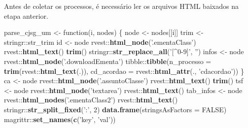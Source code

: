 \documentclass[]{book}
\newenvironment{Shaded}{\begin{snugshade}}{\end{snugshade}}
\newcommand{\KeywordTok}[1]{\textcolor[rgb]{0.13,0.29,0.53}{\textbf{{#1}}}}
\newcommand{\DataTypeTok}[1]{\textcolor[rgb]{0.13,0.29,0.53}{{#1}}}
\newcommand{\DecValTok}[1]{\textcolor[rgb]{0.00,0.00,0.81}{{#1}}}
\newcommand{\StringTok}[1]{\textcolor[rgb]{0.31,0.60,0.02}{{#1}}}
\newcommand{\OtherTok}[1]{\textcolor[rgb]{0.56,0.35,0.01}{{#1}}}
\newcommand{\NormalTok}[1]{{#1}}
\begin{document}
Antes de coletar os processos, é necessário ler os arquivos HTML
baixados na etapa anterior.

\begin{Shaded}
\begin{Highlighting}[]
\NormalTok{parse_cjsg_um <-}\StringTok{ }\NormalTok{function(i, nodes) \{}
  \NormalTok{node <-}\StringTok{ }\NormalTok{nodes[[i]]}
  \NormalTok{trim <-}\StringTok{ }\NormalTok{stringr::str_trim}
  \NormalTok{id <-}\StringTok{ }\NormalTok{node %>%}
\StringTok{    }\NormalTok{rvest::}\KeywordTok{html_node}\NormalTok{(}\StringTok{'.ementaClass'}\NormalTok{) %>%}
\StringTok{    }\NormalTok{rvest::}\KeywordTok{html_text}\NormalTok{() %>%}
\StringTok{    }\KeywordTok{trim}\NormalTok{() %>%}
\StringTok{    }\NormalTok{stringr::}\KeywordTok{str_replace_all}\NormalTok{(}\StringTok{'[^0-9]'}\NormalTok{, }\StringTok{''}\NormalTok{)}
  \NormalTok{infos <-}\StringTok{ }\NormalTok{node %>%}
\StringTok{    }\NormalTok{rvest::}\KeywordTok{html_node}\NormalTok{(}\StringTok{'.downloadEmenta'}\NormalTok{) %>%}\StringTok{ }\NormalTok{\{}
      \NormalTok{tibble::}\KeywordTok{tibble}\NormalTok{(}\DataTypeTok{n_processo =} \KeywordTok{trim}\NormalTok{(rvest::}\KeywordTok{html_text}\NormalTok{(.)),}
                     \DataTypeTok{cd_acordao =} \NormalTok{rvest::}\KeywordTok{html_attr}\NormalTok{(., }\StringTok{'cdacordao'}\NormalTok{))}
    \NormalTok{\}}
  \NormalTok{ca <-}\StringTok{ }\NormalTok{node %>%}
\StringTok{    }\NormalTok{rvest::}\KeywordTok{html_node}\NormalTok{(}\StringTok{'.assuntoClasse'}\NormalTok{) %>%}
\StringTok{    }\NormalTok{rvest::}\KeywordTok{html_text}\NormalTok{() %>%}
\StringTok{    }\KeywordTok{trim}\NormalTok{()}
  \NormalTok{tsf <-}\StringTok{ }\NormalTok{node %>%}
\StringTok{    }\NormalTok{rvest::}\KeywordTok{html_node}\NormalTok{(}\StringTok{'textarea'}\NormalTok{) %>%}
\StringTok{    }\NormalTok{rvest::}\KeywordTok{html_text}\NormalTok{()}
  \NormalTok{tab_infos <-}\StringTok{ }\NormalTok{node %>%}
\StringTok{    }\NormalTok{rvest::}\KeywordTok{html_nodes}\NormalTok{(}\StringTok{'.ementaClass2'}\NormalTok{) %>%}
\StringTok{    }\NormalTok{rvest::}\KeywordTok{html_text}\NormalTok{() %>%}
\StringTok{    }\NormalTok{stringr::}\KeywordTok{str_split_fixed}\NormalTok{(}\StringTok{':'}\NormalTok{, }\DecValTok{2}\NormalTok{) %>%}
\StringTok{    }\KeywordTok{data.frame}\NormalTok{(}\DataTypeTok{stringsAsFactors =} \OtherTok{FALSE}\NormalTok{) %>%}
\StringTok{    }\NormalTok{magrittr::}\KeywordTok{set_names}\NormalTok{(}\KeywordTok{c}\NormalTok{(}\StringTok{'key'}\NormalTok{, }\StringTok{'val'}\NormalTok{)) %>%}
}}}}}}}}}}}}}}}}}
\end{Highlighting}
\end{Shaded}
\end{document}
